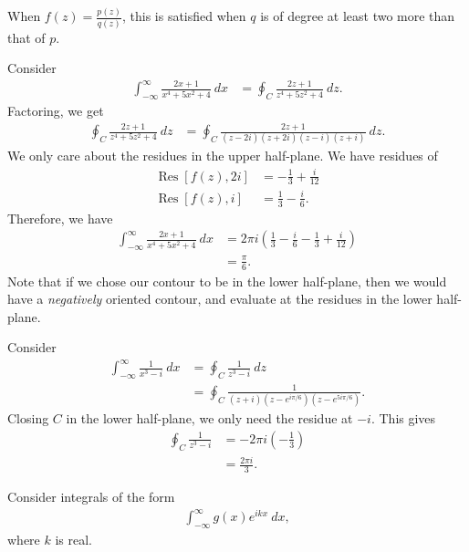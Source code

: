\documentclass[10pt]{mypackage}
\DeclareMathOperator{\res}{Res}
\begin{document}
  When $f(z) = \frac{p(z)}{q(z)}$, this is satisfied when $q$ is of degree at least two more than that of $p$.
  \begin{example}
    Consider
    \begin{align*}
      \int_{-\infty}^{\infty} \frac{2x + 1}{x^4 + 5x^2 + 4}\:dx &= \oint_{C} \frac{2z + 1}{z^4 + 5z^2 + 4}\:dz.
    \end{align*}
    Factoring, we get
    \begin{align*}
      \oint_{C}\frac{2z+1}{z^4 + 5z^2 + 4}\:dz &= \oint_{C} \frac{2z+1}{\left( z-2i \right)\left( z+2i \right)\left( z-i \right)\left( z+i \right)}\:dz.
    \end{align*}
    We only care about the residues in the upper half-plane. We have residues of
    \begin{align*}
      \res\left[ f(z),2i \right] &= -\frac{1}{3} + \frac{i}{12}\\
      \res\left[ f(z),i \right] &= \frac{1}{3} - \frac{i}{6}.
    \end{align*}
    Therefore, we have
    \begin{align*}
      \int_{-\infty}^{\infty} \frac{2x+1}{x^4 + 5x^2 + 4}\:dx &= 2\pi i \left( \frac{1}{3} - \frac{i}{6} - \frac{1}{3} + \frac{i}{12} \right)\\
                                                              &= \frac{\pi}{6}.
    \end{align*}
    Note that if we chose our contour to be in the lower half-plane, then we would have a \textit{negatively} oriented contour, and evaluate at the residues in the lower half-plane.
  \end{example}
  \begin{example}
    Consider
    \begin{align*}
      \int_{-\infty}^{\infty} \frac{1}{x^3 - i}\:dx &= \oint_{C} \frac{1}{z^3 - i}\:dz\\
                                                    &= \oint_{C} \frac{1}{\left( z +i \right)\left( z - e^{i\pi/6} \right)\left( z - e^{5i\pi/6} \right)}.
    \end{align*}
    Closing $C$ in the lower half-plane, we only need the residue at $-i$. This gives
    \begin{align*}
      \oint_{C} \frac{1}{z^3 - i} &= -2\pi i\left( -\frac{1}{3} \right)\\
                                  &= \frac{2\pi i}{3}.
    \end{align*}
  \end{example}
   Consider integrals of the form
   \begin{align*}
     \int_{-\infty}^{\infty} g(x)e^{ikx}\:dx,
   \end{align*}
   where $k$ is real.\newline
\end{document}
